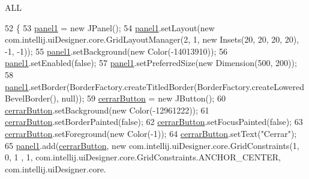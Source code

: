 A\+LL 
\begin{DoxyCode}
52                                  \{
53         \hyperlink{classpresentacion_1_1form_1_1PopUp__Estadistica_ac276266d42b873f89883dd3a869feadf}{panel1} = \textcolor{keyword}{new} JPanel();
54         \hyperlink{classpresentacion_1_1form_1_1PopUp__Estadistica_ac276266d42b873f89883dd3a869feadf}{panel1}.setLayout(\textcolor{keyword}{new} com.intellij.uiDesigner.core.GridLayoutManager(2, 1, \textcolor{keyword}{new} Insets(20, 20, 
      20, 20), -1, -1));
55         \hyperlink{classpresentacion_1_1form_1_1PopUp__Estadistica_ac276266d42b873f89883dd3a869feadf}{panel1}.setBackground(\textcolor{keyword}{new} Color(-14013910));
56         \hyperlink{classpresentacion_1_1form_1_1PopUp__Estadistica_ac276266d42b873f89883dd3a869feadf}{panel1}.setEnabled(\textcolor{keyword}{false});
57         \hyperlink{classpresentacion_1_1form_1_1PopUp__Estadistica_ac276266d42b873f89883dd3a869feadf}{panel1}.setPreferredSize(\textcolor{keyword}{new} Dimension(500, 200));
58         \hyperlink{classpresentacion_1_1form_1_1PopUp__Estadistica_ac276266d42b873f89883dd3a869feadf}{panel1}.setBorder(BorderFactory.createTitledBorder(BorderFactory.createLoweredBevelBorder(), 
      null));
59         \hyperlink{classpresentacion_1_1form_1_1PopUp__Estadistica_aad708c3569f3d964b09867708ba60bf6}{cerrarButton} = \textcolor{keyword}{new} JButton();
60         \hyperlink{classpresentacion_1_1form_1_1PopUp__Estadistica_aad708c3569f3d964b09867708ba60bf6}{cerrarButton}.setBackground(\textcolor{keyword}{new} Color(-12961222));
61         \hyperlink{classpresentacion_1_1form_1_1PopUp__Estadistica_aad708c3569f3d964b09867708ba60bf6}{cerrarButton}.setBorderPainted(\textcolor{keyword}{false});
62         \hyperlink{classpresentacion_1_1form_1_1PopUp__Estadistica_aad708c3569f3d964b09867708ba60bf6}{cerrarButton}.setFocusPainted(\textcolor{keyword}{false});
63         \hyperlink{classpresentacion_1_1form_1_1PopUp__Estadistica_aad708c3569f3d964b09867708ba60bf6}{cerrarButton}.setForeground(\textcolor{keyword}{new} Color(-1));
64         \hyperlink{classpresentacion_1_1form_1_1PopUp__Estadistica_aad708c3569f3d964b09867708ba60bf6}{cerrarButton}.setText(\textcolor{stringliteral}{"Cerrar"});
65         \hyperlink{classpresentacion_1_1form_1_1PopUp__Estadistica_ac276266d42b873f89883dd3a869feadf}{panel1}.add(\hyperlink{classpresentacion_1_1form_1_1PopUp__Estadistica_aad708c3569f3d964b09867708ba60bf6}{cerrarButton}, \textcolor{keyword}{new} com.intellij.uiDesigner.core.GridConstraints(1, 0, 1
      , 1, com.intellij.uiDesigner.core.GridConstraints.ANCHOR\_CENTER, com.intellij.uiDesigner.core.

\end{DoxyCode}
